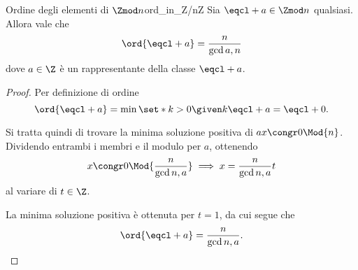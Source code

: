 \begin{proposition}
    {Ordine degli elementi di $\Zmod n$}{ord_in_Z/nZ}
    Sia $\eqcl+ a \in \Zmod n$ qualsiasi. Allora vale che \[
        \ord{\eqcl+ a} = \frac{n}{\gcd{a, n}}    
    \] dove $a \in \Z$ è un rappresentante della classe $\eqcl+ a$.
\end{proposition}
\begin{proof}
    Per definizione di ordine \[
        \ord{\eqcl+ a} = \min \set*{k > 0 \given k \eqcl+ a = \eqcl+ 0}.    
    \]

    Si tratta quindi di trovare la minima soluzione positiva di $ax \congr 0 \Mod{n}$. Dividendo entrambi i membri e il modulo per $a$, ottenendo \[
        x \congr 0 \Mod{\frac{n}{\gcd{n, a}}} \implies x = \frac{n}{\gcd{n, a}}t    
    \] al variare di $t \in \Z$. 

    La minima soluzione positiva è ottenuta per $t = 1$, da cui segue che \[
        \ord{\eqcl+ a} = \frac{n}{\gcd{n, a}}. \qedhere    
    \]
\end{proof}

